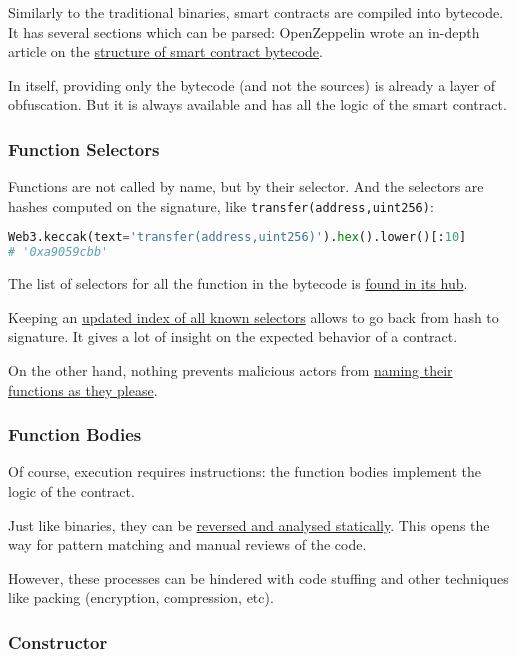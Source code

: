 Similarly to the traditional binaries, smart contracts are compiled into bytecode.
It has several sections which can be parsed: OpenZeppelin wrote an in-depth article on the \href{\urldiagrambytecode}{structure of smart contract bytecode}.

In itself, providing only the bytecode (and not the sources) is already a layer of obfuscation.
But it is always available and has all the logic of the smart contract.

\subsubsection{Function Selectors}

Functions are not called by name, but by their selector.
And the selectors are hashes computed on the signature, like \lstinline[language=Solidity]{transfer(address,uint256)}:

\begin{lstlisting}[language=Python]
Web3.keccak(text='transfer(address,uint256)').hex().lower()[:10]
# '0xa9059cbb'
\end{lstlisting}

The list of selectors for all the function in the bytecode is \href{\urldiagrambytecode}{found in its hub}.

Keeping an \href{\urlwebindexselectors}{updated index of all known selectors} allows to go back from hash to signature.
It gives a lot of insight on the expected behavior of a contract.

On the other hand, nothing prevents malicious actors from \href{https://www.4byte.directory/signatures/?bytes4_signature=0xa9059cbb}{naming their functions as they please}.

\subsubsection{Function Bodies}

Of course, execution requires instructions: the function bodies implement the logic of the contract.

Just like binaries, they can be \href{\urlarticlereversingcontract}{reversed and analysed statically}.
This opens the way for pattern matching and manual reviews of the code.

However, these processes can be hindered with code stuffing and other techniques like packing (encryption, compression, etc).

\subsubsection{Constructor}

